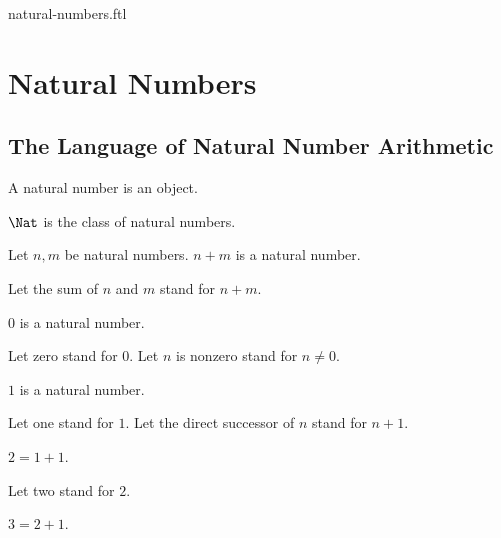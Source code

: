 \documentclass{naproche-library}
\begin{document}
\begin{smodule}{natural-numbers.ftl}


  \section*{Natural Numbers}

  \subsection*{The Language of Natural Number Arithmetic}

  \begin{signature}[forthel,id=ARITHMETIC_01_3074681254969344]
    A natural number is an object.
  \end{signature}

  \begin{definition}[forthel,id=ARITHMETIC_01_7367148418629632]
    $\Nat$ is the class of natural numbers.
  \end{definition}

  \begin{signature}[forthel,id=ARITHMETIC_01_1567933815848960]
    Let $n, m$ be natural numbers.
    $n + m$ is a natural number.

    Let the sum of $n$ and $m$ stand for $n + m$.
  \end{signature}

  \begin{signature}[forthel,id=ARITHMETIC_01_7633304715001856]
    $0$ is a natural number.

    Let zero stand for $0$.
    Let $n$ is nonzero stand for $n \neq 0$.
  \end{signature}

  \begin{signature}[forthel,id=ARITHMETIC_01_1200254566985232]
    $1$ is a natural number.

    Let one stand for $1$.
    Let the direct successor of $n$ stand for $n + 1$.
  \end{signature}

  \begin{definition}[forthel,id=ARITHMETIC_01_4584236572999680]
    $2 = 1 + 1$.

    Let two stand for $2$.
  \end{definition}

  \begin{definition}[forthel,id=ARITHMETIC_01_3836725109456896]
    $3 = 2 + 1$.


\end{definition}
\end{smodule}
\end{document}

